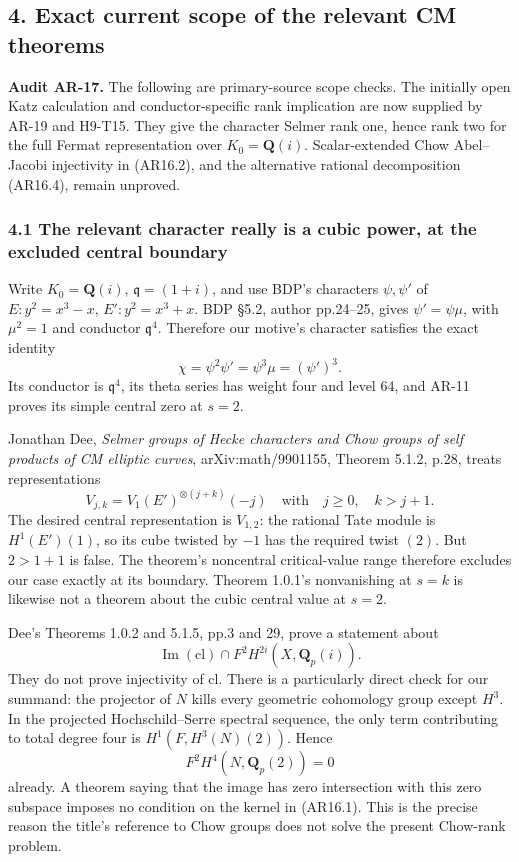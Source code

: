 \subsection{4. Exact current scope of the relevant CM
theorems}\label{exact-current-scope-of-the-relevant-cm-theorems}

\textbf{Audit AR-17.} The following are primary-source scope checks. The
initially open Katz calculation and conductor-specific rank implication
are now supplied by AR-19 and H9-T15. They give the character Selmer
rank one, hence rank two for the full Fermat representation over
\(K_0=\mathbf Q(i)\). Scalar-extended Chow Abel--Jacobi injectivity in
(AR16.2), and the alternative rational decomposition (AR16.4), remain
unproved.

\subsubsection{4.1 The relevant character really is a cubic power, at
the excluded central
boundary}\label{the-relevant-character-really-is-a-cubic-power-at-the-excluded-central-boundary}

Write \(K_0=\mathbf Q(i)\), \(\mathfrak q=(1+i)\), and use BDP's
characters \(\psi,\psi'\) of \(E:y^2=x^3-x\), \(E':y^2=x^3+x\). BDP
§5.2, author pp.24--25, gives \(\psi'=\psi\mu\), with \(\mu^2=1\) and
conductor \(\mathfrak q^4\). Therefore our motive's character satisfies
the exact identity \[
\chi=\psi^2\psi'=\psi^3\mu=(\psi')^3.
\tag{AR17.1}
\] Its conductor is \(\mathfrak q^4\), its theta series has weight four
and level 64, and AR-11 proves its simple central zero at \(s=2\).

Jonathan Dee, \emph{Selmer groups of Hecke characters and Chow groups of
self products of CM elliptic curves}, arXiv:math/9901155, Theorem 5.1.2,
p.28, treats representations \[
V_{j,k}=V_1(E')^{\otimes(j+k)}(-j)
\quad\text{with}\quad j\ge0,\quad k>j+1.
\] The desired central representation is \(V_{1,2}\): the rational Tate
module is \(H^1(E')(1)\), so its cube twisted by \(-1\) has the required
twist \((2)\). But \(2>1+1\) is false. The theorem's noncentral
critical-value range therefore excludes our case exactly at its
boundary. Theorem 1.0.1's nonvanishing at \(s=k\) is likewise not a
theorem about the cubic central value at \(s=2\).

Dee's Theorems 1.0.2 and 5.1.5, pp.3 and 29, prove a statement about \[
\operatorname{Im}(\mathrm{cl})\cap
F^2H^{2i}(X,\mathbf Q_p(i)).
\] They do not prove injectivity of \(\mathrm{cl}\). There is a
particularly direct check for our summand: the projector of \(N\) kills
every geometric cohomology group except \(H^3\). In the projected
Hochschild--Serre spectral sequence, the only term contributing to total
degree four is \(H^1(F,H^3(N)(2))\). Hence \[
F^2H^4(N,\mathbf Q_p(2))=0
\] already. A theorem saying that the image has zero intersection with
this zero subspace imposes no condition on the kernel in (AR16.1). This
is the precise reason the title's reference to Chow groups does not
solve the present Chow-rank problem.


